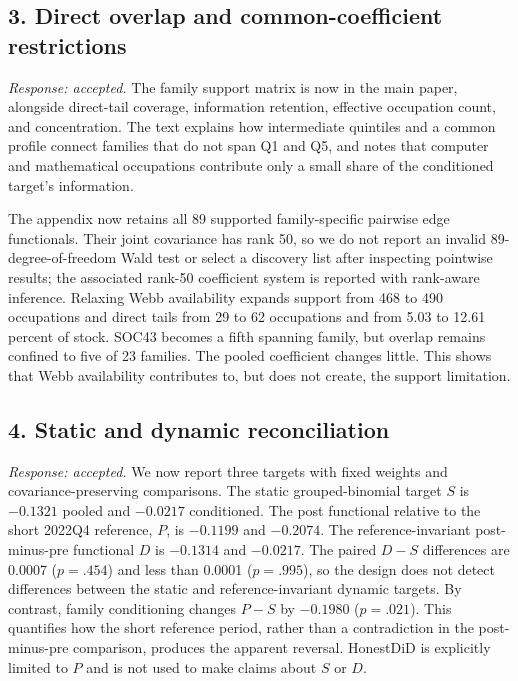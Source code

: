 \documentclass[11pt,letterpaper]{article}
\begin{document}
\subsection*{3. Direct overlap and common-coefficient restrictions}

\emph{Response: accepted.}  The family support matrix is now in the main paper, alongside direct-tail coverage, information retention, effective occupation count, and concentration.  The text explains how intermediate quintiles and a common profile connect families that do not span Q1 and Q5, and notes that computer and mathematical occupations contribute only a small share of the conditioned target's information.

The appendix now retains all 89 supported family-specific pairwise edge functionals.  Their joint covariance has rank 50, so we do not report an invalid 89-degree-of-freedom Wald test or select a discovery list after inspecting pointwise results; the associated rank-50 coefficient system is reported with rank-aware inference.  Relaxing Webb availability expands support from 468 to 490 occupations and direct tails from 29 to 62 occupations and from 5.03 to 12.61 percent of stock.  SOC43 becomes a fifth spanning family, but overlap remains confined to five of 23 families.  The pooled coefficient changes little.  This shows that Webb availability contributes to, but does not create, the support limitation.

\subsection*{4. Static and dynamic reconciliation}

\emph{Response: accepted.}  We now report three targets with fixed weights and covariance-preserving comparisons.  The static grouped-binomial target $S$ is $-0.1321$ pooled and $-0.0217$ conditioned.  The post functional relative to the short 2022Q4 reference, $P$, is $-0.1199$ and $-0.2074$.  The reference-invariant post-minus-pre functional $D$ is $-0.1314$ and $-0.0217$.  The paired $D-S$ differences are 0.0007 ($p=.454$) and less than 0.0001 ($p=.995$), so the design does not detect differences between the static and reference-invariant dynamic targets.  By contrast, family conditioning changes $P-S$ by $-0.1980$ ($p=.021$).  This quantifies how the short reference period, rather than a contradiction in the post-minus-pre comparison, produces the apparent reversal.  HonestDiD is explicitly limited to $P$ and is not used to make claims about $S$ or $D$.
\end{document}
